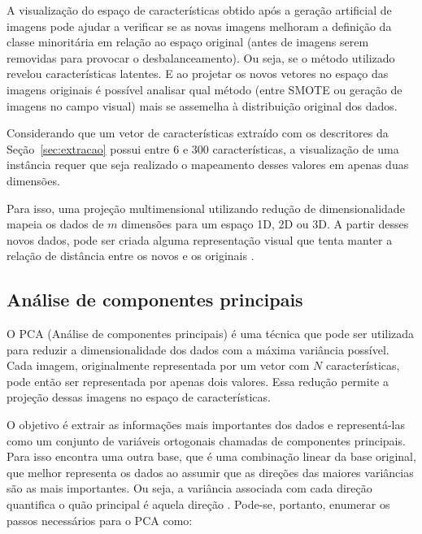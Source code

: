 A visualização do espaço de características obtido após a geração artificial de imagens pode ajudar a verificar se as novas imagens melhoram a definição da classe minoritária em relação ao espaço original (antes de imagens serem removidas para provocar o desbalanceamento). Ou seja, se o método utilizado revelou características latentes. E ao projetar os novos vetores no espaço das imagens originais é possível analisar qual método (entre SMOTE ou geração de imagens no campo visual) mais se assemelha à distribuição original dos dados.

Considerando que um vetor de características extraído com os descritores da Seção~\ref{sec:extracao} possui entre 6 e 300 características, a visualização de uma instância requer que seja realizado o mapeamento desses valores em apenas duas dimensões.

Para isso, uma projeção multimensional utilizando redução de dimensionalidade mapeia os dados de $m$ dimensões para um espaço 1D, 2D ou 3D. A partir desses novos dados, pode ser criada alguma representação visual que tenta manter a relação de distância entre os novos e os originais \cite{paulovich}.

\subsection{Análise de componentes principais}
\label{sec:pca}


O PCA (Análise de componentes principais) é uma técnica que pode ser utilizada para reduzir a dimensionalidade dos dados com a máxima variância possível. Cada imagem, originalmente representada por um vetor com $N$ características, pode então ser representada por apenas dois valores. Essa redução permite a projeção dessas imagens no espaço de características.

O objetivo é extrair as informações mais importantes dos dados e representá-las como um conjunto de variáveis ortogonais chamadas de componentes principais.
Para isso encontra uma outra base, que é uma combinação linear da base original, que melhor representa os dados ao assumir que as direções das maiores variâncias são as mais importantes. Ou seja, a variância associada com cada direção quantifica o quão principal é aquela direção \cite{Abdi2010}. Pode-se, portanto, enumerar os passos necessários para o PCA como:


